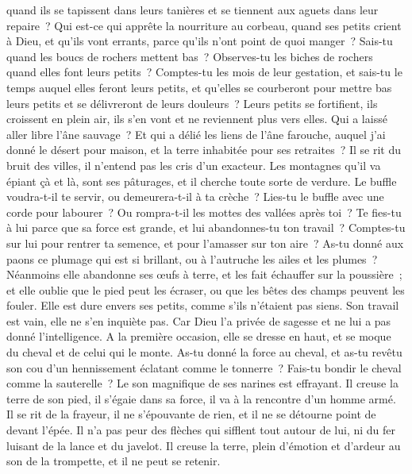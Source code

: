 \begin{multicols}{2}
quand ils se tapissent dans leurs tanières et se tiennent aux aguets dans leur repaire~?
Qui est-ce qui apprête la nourriture au corbeau, quand ses petits crient à Dieu, et qu'ils vont errants, parce qu'ils n'ont point de quoi manger~?
Sais-tu quand les boucs de rochers mettent bas~? Observes-tu les biches de rochers quand elles font leurs petits~?
Comptes-tu les mois de leur gestation, et sais-tu le temps auquel elles feront leurs petits,
et qu'elles se courberont pour mettre bas leurs petits et se délivreront de leurs douleurs~?
Leurs petits se fortifient, ils croissent en plein air, ils s'en vont et ne reviennent plus vers elles.
Qui a laissé aller libre l'âne sauvage~? Et qui a délié les liens de l'âne farouche,
auquel j'ai donné le désert pour maison, et la terre inhabitée pour ses retraites~?
Il se rit du bruit des villes, il n'entend pas les cris d'un exacteur.
Les montagnes qu'il va épiant çà et là, sont ses pâturages, et il cherche toute sorte de verdure.
Le buffle voudra-t-il te servir, ou demeurera-t-il à ta crèche~?
Lies-tu le buffle avec une corde pour labourer~? Ou rompra-t-il les mottes des vallées après toi~?
Te fies-tu à lui parce que sa force est grande, et lui abandonnes-tu ton travail~?
Comptes-tu sur lui pour rentrer ta semence, et pour l'amasser sur ton aire~?
As-tu donné aux paons ce plumage qui est si brillant, ou à l'autruche les ailes et les plumes~?
Néanmoins elle abandonne ses œufs à terre, et les fait échauffer sur la poussière~;
et elle oublie que le pied peut les écraser, ou que les bêtes des champs peuvent les fouler.
Elle est dure envers ses petits, comme s'ils n'étaient pas siens. Son travail est vain, elle ne s'en inquiète pas.
Car Dieu l'a privée de sagesse et ne lui a pas donné l'intelligence.
A la première occasion, elle se dresse en haut, et se moque du cheval et de celui qui le monte.
As-tu donné la force au cheval, et as-tu revêtu son cou d'un hennissement éclatant comme le tonnerre~?
Fais-tu bondir le cheval comme la sauterelle~? Le son magnifique de ses narines est effrayant.
Il creuse la terre de son pied, il s'égaie dans sa force, il va à la rencontre d'un homme armé.
Il se rit de la frayeur, il ne s'épouvante de rien, et il ne se détourne point de devant l'épée.
Il n'a pas peur des flèches qui sifflent tout autour de lui, ni du fer luisant de la lance et du javelot.
Il creuse la terre, plein d'émotion et d'ardeur au son de la trompette, et il ne peut se retenir.

\end{multicols}

